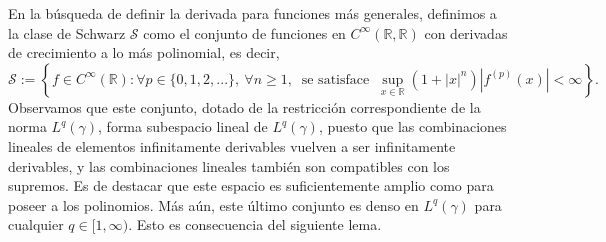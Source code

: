 \documentclass[letterpaper,twoside,12pt]{book}
\newcommand{\R}{\mathbb{R}}
\newcommand{\1}{\mathds{1}}
\theoremstyle{definition}
\theoremstyle{definition}
\theoremstyle{remark}
\theoremstyle{definition}
\theoremstyle{definition}
\theoremstyle{definition}
\theoremstyle{definition}
\theoremstyle{definition}
\begin{document}
En la búsqueda de definir la derivada para funciones más generales, definimos a la clase de Schwarz $\mathcal{S}$ como el conjunto de funciones en $C^{\infty}(\R,\R)$ con derivadas de crecimiento a lo más polinomial, es decir,
\[
\mathcal{S}:=\left\{f\in C^{\infty}(\R) : \forall p\in \{0,1,2,...\}, \ \forall n\geq1,  \ \text{ se satisface } \ \sup_{x\in\R}(1+|x|^{n})|f^{(p)}(x)|<\infty \right\}.    
\]
Observamos que este conjunto, dotado de la restricción correspondiente de la norma $L^q(\gamma)$, forma subespacio lineal de $L^{q}(\gamma)$, puesto que las combinaciones lineales de elementos infinitamente derivables vuelven a ser infinitamente derivables, y las combinaciones lineales también son compatibles con los supremos. Es de destacar que este espacio es suficientemente amplio como para poseer a los polinomios. Más aún, este último conjunto es denso en $L^{q}(\gamma)$ para cualquier $q\in [1,\infty)$. Esto es consecuencia del siguiente lema.
\end{document}
